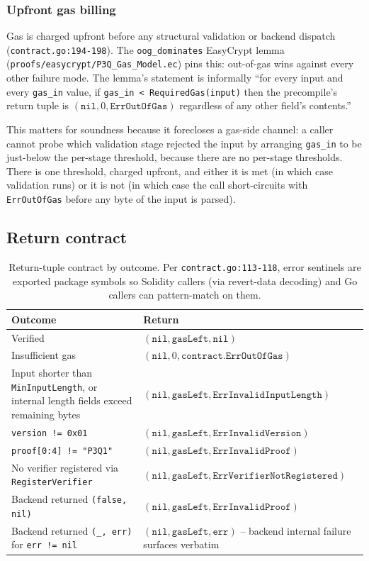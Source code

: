 \subsubsection{Upfront gas billing}

Gas is charged upfront before any structural validation or backend
dispatch (\texttt{contract.go:194-198}). The
\texttt{oog\_dominates} EasyCrypt lemma
(\texttt{proofs/easycrypt/P3Q\_Gas\_Model.ec}) pins this:
out-of-gas wins against every other failure mode. The lemma's
statement is informally ``for every input and every
\texttt{gas\_in} value, if
\texttt{gas\_in < RequiredGas(input)} then the precompile's return
tuple is $(\texttt{nil}, 0, \texttt{ErrOutOfGas})$ regardless of any
other field's contents.''

This matters for soundness because it forecloses a gas-side channel:
a caller cannot probe which validation stage rejected the input by
arranging \texttt{gas\_in} to be just-below the per-stage threshold,
because there are no per-stage thresholds. There is one threshold,
charged upfront, and either it is met (in which case validation
runs) or it is not (in which case the call short-circuits with
\texttt{ErrOutOfGas} before any byte of the input is parsed).

\subsection{Return contract}

\begin{table}[h]
\centering
\small
\begin{tabular}{@{}p{6.5cm}p{6.5cm}@{}}
\toprule
\textbf{Outcome} & \textbf{Return} \\
\midrule
Verified & $(\texttt{nil}, \texttt{gasLeft}, \texttt{nil})$ \\
Insufficient gas & $(\texttt{nil}, 0, \texttt{contract.ErrOutOfGas})$ \\
Input shorter than \texttt{MinInputLength}, or internal length fields exceed remaining bytes & $(\texttt{nil}, \texttt{gasLeft}, \texttt{ErrInvalidInputLength})$ \\
\texttt{version != 0x01} & $(\texttt{nil}, \texttt{gasLeft}, \texttt{ErrInvalidVersion})$ \\
\texttt{proof[0:4] != "P3Q1"} & $(\texttt{nil}, \texttt{gasLeft}, \texttt{ErrInvalidProof})$ \\
No verifier registered via \texttt{RegisterVerifier} & $(\texttt{nil}, \texttt{gasLeft}, \texttt{ErrVerifierNotRegistered})$ \\
Backend returned \texttt{(false, nil)} & $(\texttt{nil}, \texttt{gasLeft}, \texttt{ErrInvalidProof})$ \\
Backend returned \texttt{(\_, err)} for \texttt{err != nil} & $(\texttt{nil}, \texttt{gasLeft}, \texttt{err})$ -- backend internal failure surfaces verbatim \\
\bottomrule
\end{tabular}
\caption{Return-tuple contract by outcome. Per
\texttt{contract.go:113-118}, error sentinels are exported package
symbols so Solidity callers (via revert-data decoding) and Go
callers can pattern-match on them.}
\label{tab:return-contract}
\end{table}

